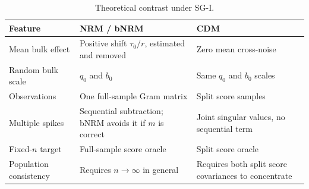 \begin{table}[ht]
\centering
\caption{Theoretical contrast under SG-I.}\label{tab:nrmcdm}
\small
\begin{tabular}{@{}p{}p{}p{}@{}}
\toprule
Feature & NRM / bNRM & CDM \\
\midrule
Mean bulk effect & Positive shift $\tau_0/r$, estimated and removed & Zero mean cross-noise \\
Random bulk scale & $q_0$ and $b_0$ & Same $q_0$ and $b_0$ scales \\
Observations & One full-sample Gram matrix & Split score samples \\
Multiple spikes & Sequential subtraction; bNRM avoids it if $m$ is correct & Joint singular values, no sequential term \\
Fixed-$n$ target & Full-sample score oracle & Split score oracle \\
Population consistency & Requires $n\to\infty$ in general & Requires both split score covariances to concentrate \\
\bottomrule
\end{tabular}
\end{table}
